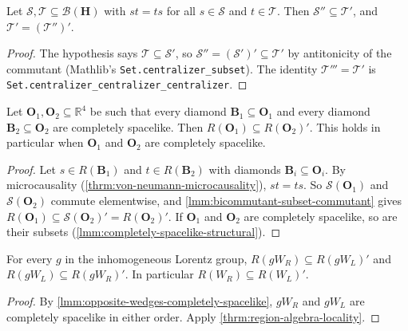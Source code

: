 \begin{lemma}
    \label{lmm:bicommutant-subset-commutant}
    \leanok
    Let $\mathcal{S}, \mathcal{T} \subseteq \mathcal{B}(\mathbf{H})$ with $st = ts$ for all $s \in \mathcal{S}$ and $t \in \mathcal{T}$. Then $\mathcal{S}'' \subseteq \mathcal{T}'$, and $\mathcal{T}' = (\mathcal{T}'')'$.
\end{lemma}
\begin{proof}
    \leanok
    The hypothesis says $\mathcal{T} \subseteq \mathcal{S}'$, so $\mathcal{S}'' = (\mathcal{S}')' \subseteq \mathcal{T}'$ by antitonicity of the commutant (Mathlib's \texttt{Set.centralizer\_subset}). The identity $\mathcal{T}''' = \mathcal{T}'$ is \texttt{Set.centralizer\_centralizer\_centralizer}.
\end{proof}

\begin{theorem}
    \label{thrm:region-algebra-locality}
    \leanok
    Let $\mathbf{O}_1, \mathbf{O}_2 \subseteq \mathbb{R}^4$ be such that every diamond $\mathbf{B}_1 \subseteq \mathbf{O}_1$ and every diamond $\mathbf{B}_2 \subseteq \mathbf{O}_2$ are completely spacelike. Then $R(\mathbf{O}_1) \subseteq R(\mathbf{O}_2)'$. This holds in particular when $\mathbf{O}_1$ and $\mathbf{O}_2$ are completely spacelike.
\end{theorem}
\begin{proof}
    \leanok
    Let $s \in R(\mathbf{B}_1)$ and $t \in R(\mathbf{B}_2)$ with diamonds $\mathbf{B}_i \subseteq \mathbf{O}_i$. By microcausality (\ref{thrm:von-neumann-microcausality}), $st = ts$. So $\mathcal{S}(\mathbf{O}_1)$ and $\mathcal{S}(\mathbf{O}_2)$ commute elementwise, and \ref{lmm:bicommutant-subset-commutant} gives $R(\mathbf{O}_1) \subseteq \mathcal{S}(\mathbf{O}_2)' = R(\mathbf{O}_2)'$. If $\mathbf{O}_1$ and $\mathbf{O}_2$ are completely spacelike, so are their subsets (\ref{lmm:completely-spacelike-structural}).
\end{proof}

\begin{corollary}
    \label{crllr:opposite-wedge-locality}
    \leanok
    For every $g$ in the inhomogeneous Lorentz group, $R(gW_R) \subseteq R(gW_L)'$ and $R(gW_L) \subseteq R(gW_R)'$. In particular $R(W_R) \subseteq R(W_L)'$.
\end{corollary}
\begin{proof}
    \leanok
    By \ref{lmm:opposite-wedges-completely-spacelike}, $gW_R$ and $gW_L$ are completely spacelike in either order. Apply \ref{thrm:region-algebra-locality}.
\end{proof}

